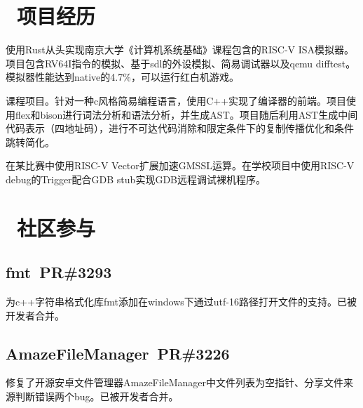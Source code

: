 \documentclass{resume}
\begin{document}
\section{\faCogs\ 项目经历}
\begin{onehalfspacing}
  使用Rust从头实现南京大学《计算机系统基础》课程包含的RISC-V ISA模拟器。项目包含RV64I指令的模拟、基于sdl的外设模拟、简易调试器以及qemu difftest。模拟器性能达到native的4.7\%，可以运行红白机游戏。
\end{onehalfspacing}

\begin{onehalfspacing}
  课程项目。针对一种c风格简易编程语言，使用C++实现了编译器的前端。项目使用flex和bison进行词法分析和语法分析，并生成AST。项目随后利用AST生成中间代码表示（四地址码），进行不可达代码消除和限定条件下的复制传播优化和条件跳转简化。
\end{onehalfspacing}

\begin{onehalfspacing}
  在某比赛中使用RISC-V Vector扩展加速GMSSL运算。在学校项目中使用RISC-V debug的Trigger配合GDB stub实现GDB远程调试裸机程序。
\end{onehalfspacing}



\section{\faGithub\ 社区参与}
\subsection{fmt~PR\#3293}
为c++字符串格式化库fmt添加在windows下通过utf-16路径打开文件的支持。已被开发者合并。

\subsection{AmazeFileManager~PR\#3226}
修复了开源安卓文件管理器AmazeFileManager中文件列表为空指针、分享文件来源判断错误两个bug。已被开发者合并。
\end{document}
